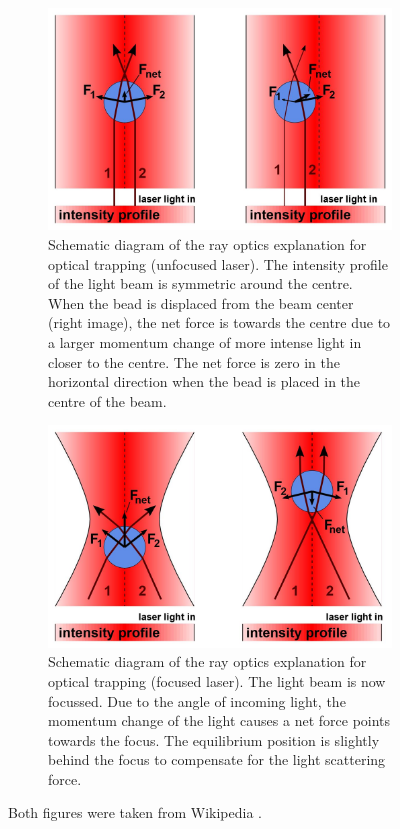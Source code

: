 \begin{figure}[h!]
    \begin{subfigure}{.45\textwidth}
    	\centering
    	\includegraphics[width=0.9\linewidth,keepaspectratio]{figures/Optical_trap_unfocused.jpg}
    	\caption{ Schematic diagram of the ray optics explanation for optical trapping (unfocused laser). The intensity profile of the light beam is symmetric around the centre. When the bead is displaced from the beam center (right image), the net force is towards the centre due to a larger momentum change of more intense light in closer to the centre. The net force is zero in the horizontal direction when the bead is placed in the centre of the beam. }
    	\label{fig_optic_trap_1}
	\end{subfigure} %
	\hfill
	\begin{subfigure}{0.45\textwidth}
		\centering
		\includegraphics[width=0.9\linewidth,keepaspectratio]{figures/Optical_trap_focused.jpg}
    	\caption{Schematic diagram of the ray optics explanation for optical trapping (focused laser). The light beam is now focussed. Due to the angle of incoming light, the momentum change of the light causes a net force points towards the focus. The equilibrium position is slightly behind the focus to compensate for the light scattering force. }
    	\label{fig_optic_trap_2}
	\end{subfigure}
	\caption{Both figures were taken from Wikipedia \cite{wikipedia}.}
\end{figure}


